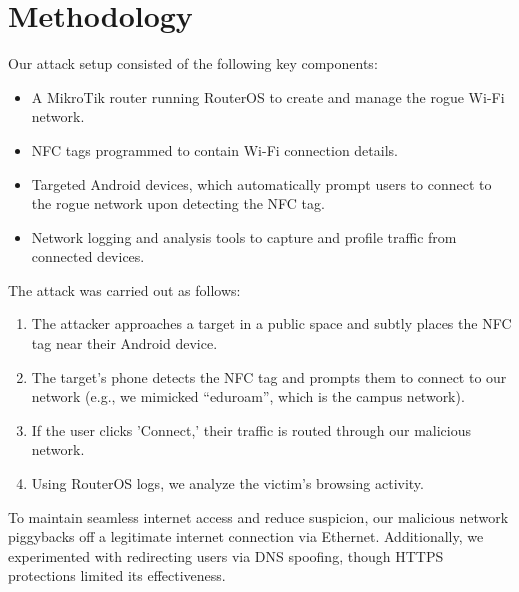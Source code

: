 \documentclass[sigconf]{acmart}
\begin{document}
\section{Methodology}
Our attack setup consisted of the following key components:
\begin{itemize}
    \item A MikroTik router running RouterOS to create and manage the rogue Wi-Fi network.
    \item NFC tags programmed to contain Wi-Fi connection details.
    \item Targeted Android devices, which automatically prompt users to connect to the rogue network upon detecting the NFC tag.
    \item Network logging and analysis tools to capture and profile traffic from connected devices.
\end{itemize}

The attack was carried out as follows:
\begin{enumerate}
    \item The attacker approaches a target in a public space and subtly places the NFC tag near their Android device.
    \item The target's phone detects the NFC tag and prompts them to connect to our network (e.g., we mimicked “eduroam”, which is the campus network).
    \item If the user clicks 'Connect,' their traffic is routed through our malicious network.
    \item Using RouterOS logs, we analyze the victim's browsing activity.
\end{enumerate}

To maintain seamless internet access and reduce suspicion, our malicious network piggybacks off a legitimate internet connection via Ethernet. Additionally, we experimented with redirecting users via DNS spoofing, though HTTPS protections limited its effectiveness.
\end{document}

